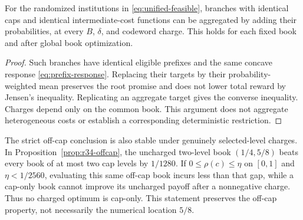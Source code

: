 \begin{proposition}\label{prop:interior-aggregation}
For the randomized institutions in \eqref{eq:unified-feasible}, branches with identical caps and identical intermediate-cost functions can be aggregated by adding their probabilities, at every $B$, $\delta$, and codeword charge. This holds for each fixed book and after global book optimization.
\end{proposition}
\begin{proof}
Such branches have identical eligible prefixes and the same concave response \eqref{eq:prefix-response}. Replacing their targets by their probability-weighted mean preserves the root promise and does not lower total reward by Jensen's inequality. Replicating an aggregate target gives the converse inequality. Charges depend only on the common book. This argument does not aggregate heterogeneous costs or establish a corresponding deterministic restriction.
\end{proof}

The strict off-cap conclusion is also stable under genuinely selected-level charges. In Proposition~\ref{prop:r34-offcap}, the uncharged two-level book $(1/4,5/8)$ beats every book of at most two cap levels by $1/1280$. If $0\leq\rho(c)\leq\eta$ on $[0,1]$ and $\eta<1/2560$, evaluating this same off-cap book incurs less than that gap, while a cap-only book cannot improve its uncharged payoff after a nonnegative charge. Thus no charged optimum is cap-only. This statement preserves the off-cap property, not necessarily the numerical location $5/8$.
